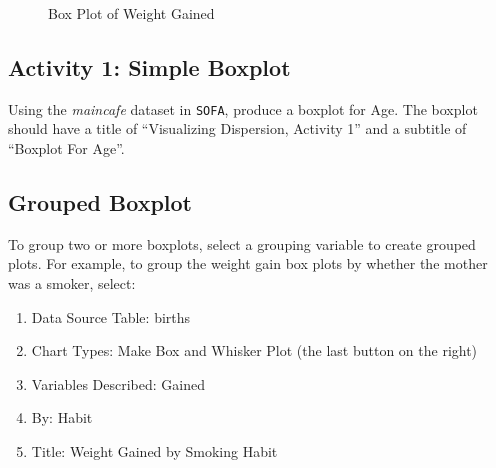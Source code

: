 \begin{figure}[H]
  \begin{center}
    \caption{Box Plot of Weight Gained}
  \end{center}
\end{figure}

\subsection{Activity 1: Simple Boxplot} \label{vdi:act01}

Using the \textit{maincafe} dataset in \texttt{SOFA}, produce a boxplot for Age. The boxplot should have a title of ``Visualizing Dispersion, Activity 1'' and a subtitle of ``Boxplot For Age''.

\subsection{Grouped Boxplot}

To group two or more boxplots, select a grouping variable to create grouped plots. For example, to group the weight gain box plots by whether the mother was a smoker, select:

\begin{enumerate}
  \item Data Source Table: births
  \item Chart Types: Make Box and Whisker Plot (the last button on the right)
  \item Variables Described: Gained
  \item By: Habit
  \item Title: Weight Gained by Smoking Habit
\end{enumerate}

